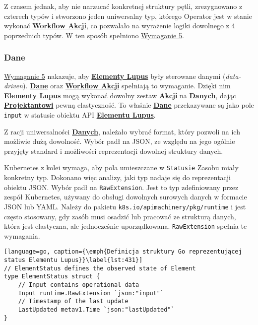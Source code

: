 Z czasem jednak, aby nie narzucać konkretnej struktury pętli, zrezygnowano z czterech typów i stworzono jeden uniwersalny typ, którego Operator jest w stanie wykonać \hyperlink{def:workflow-petli}{\textbf{Workflow Akcji}}, co pozwalało na wyrażenie logiki dowolnego z 4 poprzednich typów. W ten sposób spełniono \hyperref[req:5]{Wymaganie 5}.

\subsubsection{Dane}

\hyperref[req:5]{Wymaganie 5} nakazuje, aby \hyperlink{def:element-lupus}{\textbf{Elementy Lupus}} były sterowane danymi (\textit{data-driven}). \hyperlink{def:dane}{\textbf{Dane}} oraz \hyperlink{def:workflow-petli}{\textbf{Workflow Akcji}} spełniają to wymaganie. Dzięki nim \hyperlink{def:element-lupus}{\textbf{Elementy Lupus}} mogą wykonać dowolny zestaw \hyperlink{def:akcja}{\textbf{Akcji}} na \hyperlink{def:dane}{\textbf{Danych}}, dając \hyperlink{def:projektant}{\textbf{Projektantowi}} pewną elastyczność. To właśnie \hyperlink{def:dane}{\textbf{Dane}} przekazywane są jako pole \texttt{input} w statusie obiektu API \hyperlink{def:element-lupus}{\textbf{Elementu Lupus}}. 

Z racji uniwersalności \hyperlink{def:dane}{\textbf{Danych}}, należało wybrać format, który pozwoli na ich możliwie dużą dowolność. Wybór padł na JSON, ze względu na jego ogólnie przyjęty standard i możliwości reprezentacji dowolnej struktury danych. 

Kubernetes z kolei wymaga, aby pola umieszczane w \texttt{Statusie} Zasobu miały konkretny typ. Dokonano więc analizy, jaki typ nadaje się do reprezentacji obiektu JSON. Wybór padł na \texttt{RawExtension}. Jest to typ zdefiniowany przez zespół Kubernetes, używany do obsługi dowolnych surowych danych w formacie JSON lub YAML. Należy do pakietu \texttt{k8s.io/apimachinery/pkg/runtime} i jest często stosowany, gdy zasób musi osadzić lub pracować ze strukturą danych, która jest elastyczna, ale jednocześnie uporządkowana. \texttt{RawExtension} spełnia te wymagania.

\begin{lstlisting}[language=go, caption={\emph{Definicja struktury Go reprezentującej status Elementu Lupus}}\label{lst:431}]
// ElementStatus defines the observed state of Element
type ElementStatus struct {
	// Input contains operational data
	Input runtime.RawExtension `json:"input"`
	// Timestamp of the last update
	LastUpdated metav1.Time `json:"lastUpdated"`
}
\end{lstlisting}

